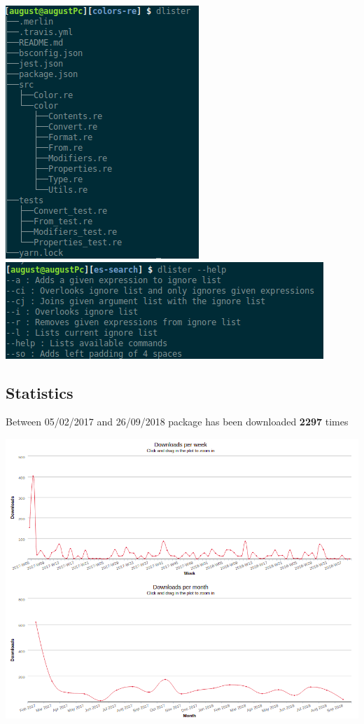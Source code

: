 \documentclass{article}
\begin{document}
\begin{multicols}{2}
  \includegraphics[scale=0.5]{dlister_use.png}
  \includegraphics[scale=0.8]{dlister_help.png}
\end{multicols}

\pagebreak

\subsection{Statistics}
\begin{flushleft}
Between 05/02/2017 and 26/09/2018 package has been downloaded \textbf{2297} times
\end{flushleft}

\begin{center}
  \includegraphics[scale=0.5]{dlister.png}
\end{center}
\end{document}
